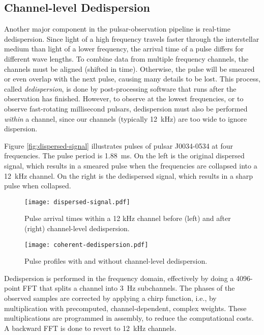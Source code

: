 \documentclass{llncs}
\begin{document}
\subsection{Channel-level Dedispersion}

Another major component in the pulsar-observation pipeline is real-time dedispersion.  Since light of a high frequency travels faster through the interstellar medium than light of a lower frequency, the arrival time of a pulse differs for different wave lengths. To combine data from multiple frequency channels, the channels must be aligned (shifted in time). Otherwise, the pulse will be smeared or even overlap with the next pulse, causing many details to be lost. This process, called \emph{dedispersion}, is done by post-processing software that runs after the observation has finished.  However, to observe at the lowest frequencies, or to observe fast-rotating millisecond pulsars, dedispersion must also be performed \emph{within\/} a channel, since our channels (typically 12~kHz) are too wide to ignore dispersion.

Figure \ref{fig:dispersed-signal} illustrates pulses of pulsar J0034-0534 at four frequencies. The pulse period is 1.88~ms. On the left is the original dispersed signal, which results in a smeared pulse when the frequencies are collapsed into a 12~kHz channel. On the right is the dedispersed signal, which results in a sharp pulse when collapsed.

\begin{figure}[ht]
\begin{minipage}[t]{0.60\textwidth}
\center
\texttt{[image: dispersed-signal.pdf]}
\caption{Pulse arrival times within a 12 kHz channel before (left) and after (right) channel-level dedispersion.}
\label{fig:dispersed-signal}
\end{minipage}
\hfill
\begin{minipage}[t]{0.35\textwidth}
\center
\texttt{[image: coherent-dedispersion.pdf]}
\caption{Pulse profiles with and without channel-level dedispersion.}
\label{fig:dedispersion-result}
\end{minipage}
\end{figure}

Dedispersion is performed in the frequency domain, effectively by doing a 4096-point FFT that splits a channel into 3~Hz subchannels. The phases of the observed samples are corrected by applying a chirp function, i.e., by multiplication with precomputed, channel-dependent, complex weights. These multiplications are programmed in assembly, to reduce the computational costs. A backward FFT is done to revert to 12~kHz channels.
\end{document}
